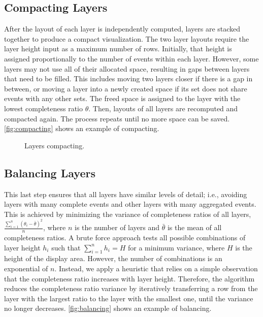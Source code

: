 \subsection{Compacting Layers}
\label{sub:compact}
After the layout of each layer is independently computed, layers are stacked together to produce a compact visualization. The two layer layouts require the layer height input as a maximum number of rows. Initially, that height is assigned proportionally to the number of events within each layer. However, some layers may not use all of their allocated space, resulting in gaps between layers that need to be filled. This includes moving two layers closer if there is a gap in between, or moving a layer into a newly created space if its set does not share events with any other sets. The freed space is assigned to the layer with the lowest completeness ratio $\theta$. Then, layouts of all layers are recomputed and compacted again. The process repeats until no more space can be saved. \autoref{fig:compacting} shows an example of compacting.

\begin{figure}
	\centering
	\hfill
	\caption{Layers compacting.}
	\label{fig:compacting}
\end{figure}

\subsection{Balancing Layers}
This last step ensures that all layers have similar levels of detail; i.e., avoiding layers with many complete events and other layers with many aggregated events. This is achieved by minimizing the variance of completeness ratios of all layers,
$\frac{\sum\limits_{i=1}^{n}(\theta_i - \bar{\theta})^2} {n}$, where $n$ is the number of layers and $\bar{\theta}$ is the mean of all completeness ratios. A brute force approach tests all possible combinations of layer height $h_i$ such that $\sum\limits_{i=1}^{n}h_i=H$ for a minimum variance, where $H$ is the height of the display area. However, the number of combinations is an exponential of $n$. Instead, we apply a heuristic that relies on a simple observation that the completeness ratio increases with layer height. Therefore, the algorithm reduces the completeness ratio variance by iteratively transferring a row from the layer with the largest ratio to the layer with the smallest one, until the variance no longer decreases. \autoref{fig:balancing} shows an example of balancing.

